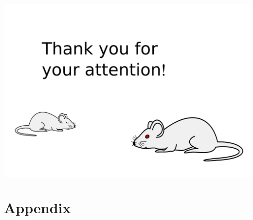 \documentclass[xcolor=x11names,compress]{beamer}
\renewcommand{\(}{\begin{columns}}
\renewcommand{\)}{\end{columns}}
\newcommand{\<}[1]{\begin{column}{#1}}
\renewcommand{\>}{\end{column}}
\begin{document}
\begin{frame}[t]{}
    \includegraphics[height=0.9\textheight]{thank_you}
\end{frame}


\section*{Appendix}
\label{sec:appendix}


\end{document}
